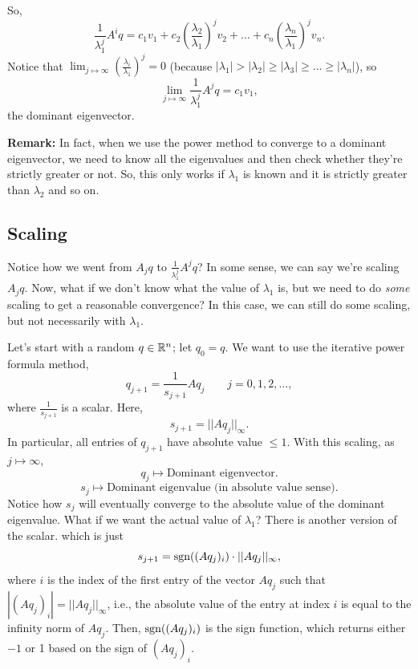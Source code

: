 \documentclass[letterpaper]{article}
\newcommand{\0}{\mathbf{0}}
\begin{document}
So, 
\[\frac{1}{\lambda_1^j} A^i q = c_1 v_1 + c_2 \left(\frac{\lambda_2}{\lambda_1}\right)^j v_2 + \hdots + c_n \left(\frac{\lambda_n}{\lambda_1}\right)^j v_n.\]
Notice that $\lim_{j \mapsto \infty} \left(\frac{\lambda_i}{\lambda_1}\right)^j = 0$ (because $|\lambda_1| > |\lambda_2| \geq |\lambda_3| \geq \hdots \geq |\lambda_n|$), so \[\lim_{j \mapsto \infty} \frac{1}{\lambda_1^j} A^j q = c_1 v_1,\]
the dominant eigenvector.

\bigskip 

\textbf{Remark:} In fact, when we use the power method to converge to a dominant eigenvector, we need to know all the eigenvalues and then check whether they're strictly greater or not. So, this only works if $\lambda_1$ is known and it is strictly greater than $\lambda_2$ and so on. 

\subsection{Scaling}
Notice how we went from $A_j q$ to $\frac{1}{\lambda_1^j} A^j q$? In some sense, we can say we're scaling $A_j q$. Now, what if we don't know what the value of $\lambda_1$ is, but we need to do \emph{some} scaling to get a reasonable convergence? In this case, we can still do some scaling, but not necessarily with $\lambda_1$. 

\bigskip 

Let's start with a random $q \in \mathbb{R}^n$; let $q_0 = q$. We want to use the iterative power formula method, 
\[\boxed{q_{j + 1} = \frac{1}{s_{j + 1}} Aq_j \qquad j = 0, 1, 2, \hdots},\]
where $\frac{1}{s_{j + 1}}$ is a scalar. Here, 
\[s_{j + 1} = ||Aq_j||_\infty.\]
In particular, all entries of $q_{j + 1}$ have absolute value $\leq 1$. With this scaling, as $j \mapsto \infty$, 
\[q_j \mapsto \text{Dominant eigenvector.}\]
\[s_j \mapsto \text{Dominant eigenvalue (in absolute value sense).}\]
Notice how $s_j$ will eventually converge to the absolute value of the dominant eigenvalue. What if we want the actual value of $\lambda_1$? There is another version of the scalar. which is just 
\[s_{j + 1} = \operatorname{sgn}((Aq_{j})_i) \cdot ||Aq_j||_\infty,\]
where $i$ is the index of the first entry of the vector $Aq_j$ such that $|(Aq_j)_{i}| = ||Aq_j||_\infty$, i.e., the absolute value of the entry at index $i$ is equal to the infinity norm of $Aq_j$. Then, $\operatorname{sgn}((Aq_{j})_i)$ is the sign function, which returns either $-1$ or 1 based on the sign of $(Aq_{j})_i$.  
\end{document}
